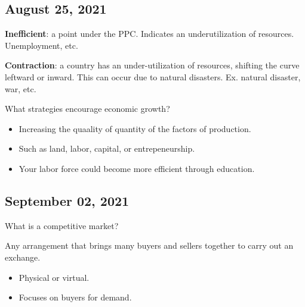 \documentclass{scrreprt} %
\begin{document}
\subsection{August 25, 2021}

\begin{example}

\textbf{Inefficient}: a point under the PPC. Indicates an underutilization of resources.
Unemployment, etc.

\textbf{Contraction}: a country has an under-utilization of resources, shifting the curve
leftward or inward. This can occur due to natural disasters.
Ex. natural disaster, war, etc.

\end{example}

What strategies encourage economic growth?

\begin{itemize}
	\item Increasing the quaality of quantity of the factors of production.
	\item Such as land, labor, capital, or entrepeneurship.
	\item Your labor force could become more efficient through education.
\end{itemize}

\subsection{September 02, 2021}

\begin{definition}
	What is a competitive market?

	Any arrangement that brings many buyers and sellers together to 
	carry out an exchange.
	\begin{itemize}
		\item Physical or virtual.
		\item Focuses on buyers for demand.
	\end{itemize}
\end{definition}
\end{document}
